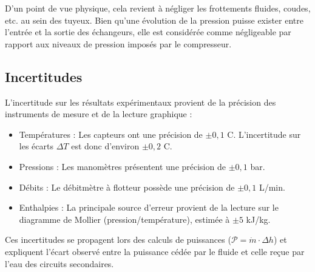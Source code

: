 \documentclass[a4paper,10pt,french]{scrartcl}
\begin{document}
D'un point de vue physique, cela revient à négliger les frottements fluides, coudes, etc. au sein des tuyeux. Bien qu'une évolution de la pression puisse exister entre l'entrée et la sortie des échangeurs, elle est considérée comme négligeable par rapport aux niveaux de pression imposés par le compresseur.

\subsection{Incertitudes}
L'incertitude sur les résultats expérimentaux provient de la précision des instruments de mesure et de la lecture graphique :
\begin{itemize}
    \item {Températures :} Les capteurs ont une précision de $\pm 0,1$ C. L'incertitude sur les écarts $\Delta T$ est donc d'environ $\pm 0,2$ C.
    \item {Pressions :} Les manomètres présentent une précision de $\pm 0,1$ bar.
    \item {Débits :} Le débitmètre à flotteur possède une précision de $\pm 0,1$ L/min.
    \item {Enthalpies :} La principale source d'erreur provient de la lecture sur le diagramme de Mollier (pression/température), estimée à $\pm 5$ kJ/kg.
\end{itemize}
Ces incertitudes se propagent lors des calculs de puissances ($\mathcal{P} = \dot{m} \cdot \Delta h$) et expliquent l'écart observé entre la puissance cédée par le fluide et celle reçue par l'eau des circuits secondaires.
\end{document}
